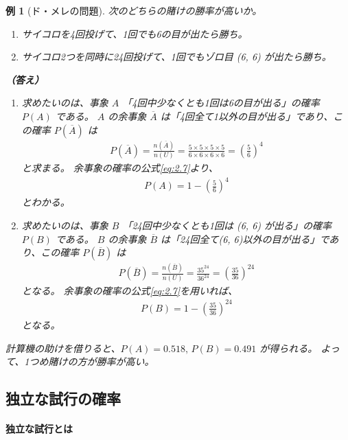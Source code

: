 \documentclass[12pt]{ltjsarticle}\usepackage{ifthen}\newcounter{enlarge}\setcounter{enlarge}{1}
\newtheorem{eg}{例}
\begin{document}
\begin{eg}[ド・メレの問題]
  次のどちらの賭けの勝率が高いか。
  \begin{enumerate}
  \item サイコロを4回投げて、1回でも6の目が出たら勝ち。
  \item サイコロ2つを同時に24回投げて、1回でもゾロ目 (6, 6) が出たら勝ち。
  \end{enumerate}

  \textbf{（答え）}
  \begin{enumerate}
  \item 求めたいのは、事象 $A$ 「4回中少なくとも1回は6の目が出る」の確率 $P(A)$ である。
    $A$ の余事象 $\overline{A}$ は「4回全て1以外の目が出る」であり、この確率 $P(\overline{A})$ は
    \begin{align}
      P(\overline{A}) = \frac{n(\overline{A})}{n(U)} = \frac{5 \times 5 \times 5 \times 5}{6 \times 6 \times 6 \times 6} = \left( \frac{5}{6} \right)^4 \label{eq:2.7.1}
    \end{align}
    と求まる。
    余事象の確率の公式\eqref{eq:2.7}より、
    \begin{align}
      P(A) = 1 - \left( \frac{5}{6} \right)^4 \label{eq:2.7.2}
    \end{align}
    とわかる。
  \item 求めたいのは、事象 $B$ 「24回中少なくとも1回は (6, 6) が出る」の確率 $P(B)$ である。
    $B$ の余事象 $\overline{B}$ は「24回全て(6, 6)以外の目が出る」であり、この確率 $P(\overline{B})$ は
    \begin{align}
      P(\overline{B}) = \frac{n(\overline{B})}{n(U)} = \frac{35^{24}}{36^{24}} = \left( \frac{35}{36} \right)^{24} \label{eq:2.7.3}
    \end{align}
    となる。
    余事象の確率の公式\eqref{eq:2.7}を用いれば、
    \begin{align}
      P(B) = 1 - \left( \frac{35}{36} \right)^{24} \label{eq:2.7.4}
    \end{align}
    となる。
  \end{enumerate}

  計算機の助けを借りると、$P(A) = 0.518,\, P(B) = 0.491$ が得られる。
  よって、1つめ賭けの方が勝率が高い。
\end{eg}

\subsection{独立な試行の確率}

\paragraph{独立な試行とは}
\end{document}
